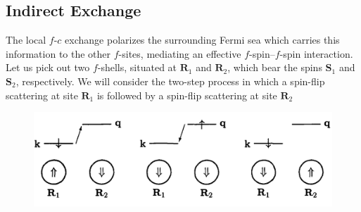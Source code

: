 \documentclass{article}
\begin{document}
\subsection{Indirect Exchange}
The local $\textit{f-c}$ exchange polarizes the surrounding Fermi sea which carries this information to the other $\textit{f}$-sites, mediating an effective $\textit{f}$-spin--$\textit{f}$-spin interaction. Let us pick out two $\textit{f}$-shells, situated at $\textbf{R}_1$ and $\textbf{R}_2$, which bear the spins $\textbf{S}_1$ and $\textbf{S}_2$, respectively. We will consider the two-step process in which a spin-flip scattering at site $\textbf{R}_1$ is followed by a spin-flip scattering at site $\textbf{R}_2$ 
\\
\begin{figure}[H]
\centering
\includegraphics[scale=0.35]{scattering.png}
\end{figure}
\end{document}
